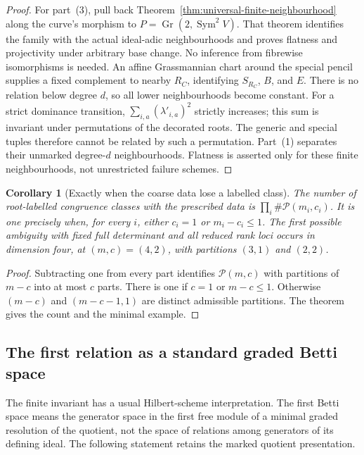 \documentclass[11pt,reqno]{amsart}
\numberwithin{equation}{section}
\newtheorem{corollary}[theorem]{Corollary}
\theoremstyle{definition}\newtheorem{definition}[theorem]{Definition}
\theoremstyle{remark}\newtheorem{remark}[theorem]{Remark}
\DeclareMathOperator{\Sym}{Sym}\DeclareMathOperator{\Gr}{Gr}
\begin{document}
\begin{proof}
For part~(3), pull back Theorem~\ref{thm:universal-finite-neighbourhood}
along the curve's morphism to \(P=\Gr(2,\Sym^2V)\).
That theorem identifies the family with the actual ideal-adic
neighbourhoods and proves flatness and projectivity under arbitrary
base change. No inference from fibrewise isomorphisms is needed.
An affine Grassmannian chart around the special pencil supplies a
fixed complement to nearby \(R_C\), identifying \(S_{R_C}\),
\(B\), and \(E\). There is no relation below degree \(d\),
so all lower neighbourhoods become constant. For a strict dominance
transition, \(\sum_{i,a}(\lambda'_{i,a})^2\) strictly increases;
this sum is invariant under permutations of the decorated roots.
The generic and special tuples therefore cannot be related by such
a permutation. Part~(1) separates their unmarked degree-\(d\)
neighbourhoods. Flatness is asserted only for these finite
neighbourhoods, not unrestricted failure schemes.
\end{proof}

\begin{corollary}[Exactly when the coarse data lose a labelled class]
\label{cor:fixed-spectral-ambiguity}
The number of root-labelled congruence classes with the prescribed
data is \(\prod_i\#\mathcal P(m_i,c_i)\). It is one precisely
when, for every \(i\), either \(c_i=1\) or \(m_i-c_i\le1\).
The first possible ambiguity with fixed full determinant and all
reduced rank loci occurs in dimension four, at \((m,c)=(4,2)\),
with partitions \((3,1)\) and \((2,2)\).
\end{corollary}
\begin{proof}
Subtracting one from every part identifies \(\mathcal P(m,c)\)
with partitions of \(m-c\) into at most \(c\) parts.
There is one if \(c=1\) or \(m-c\le1\). Otherwise
\((m-c)\) and \((m-c-1,1)\) are distinct admissible partitions.
The theorem gives the count and the minimal example.
\end{proof}

\subsection{The first relation as a standard graded Betti space}

The finite invariant has a usual Hilbert-scheme interpretation.
The first Betti space means the generator space in the first free
module of a minimal graded resolution of the quotient, not the space
of relations among generators of its defining ideal. The following
statement retains the marked quotient presentation.
\end{document}
